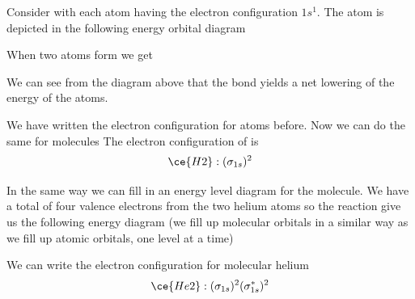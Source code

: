 \documentclass[../mit-general-chemistry.tex]{subfiles}
\begin{document}
Consider  with each atom having the electron configuration
$1s^1$. The  atom is depicted in the following energy orbital
diagram

\begin{center}
  \begin{MOdiagram}[names,labels,labels-fs=\footnotesize]
    \EnergyAxis[title=$E$]
  \end{MOdiagram}
\end{center}

When two  atoms form 
we get

\begin{center}
  \begin{MOdiagram}[names,labels,labels-fs=\footnotesize]
    \EnergyAxis[title=$E$]
  \end{MOdiagram}
\end{center}


We can see from the diagram above that the bond yields a net lowering
of the energy of the atoms.

We have written the electron configuration for atoms before. Now we
can do the same for molecules The electron configuration of  is
\begin{equation*}
  \ce{H2}: (\sigma_{1s})^2
\end{equation*}



In the same way we can fill in an energy level diagram for the
 molecule. We have a total of four valence electrons from the
two helium atoms so the reaction
give us the following energy diagram (we fill up molecular orbitals in
a similar way as we fill up atomic orbitals, one level at a time)

\begin{center}
  \begin{MOdiagram}[names,labels,labels-fs=\footnotesize]
    \EnergyAxis[title=$E$]
  \end{MOdiagram}
\end{center}

We can write the electron configuration for molecular helium
\begin{equation*}
  \ce{He2}: (\sigma_{1s})^2(\sigma^*_{1s})^2
\end{equation*}
\end{document}
